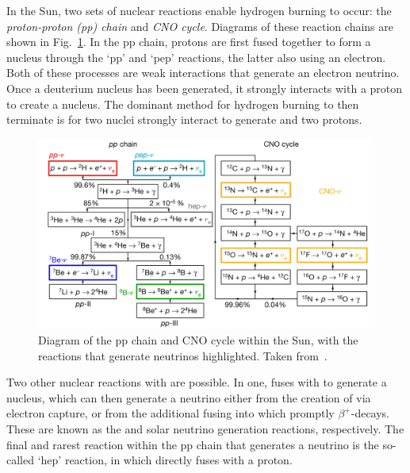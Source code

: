In the Sun, two sets of nuclear reactions enable hydrogen burning to occur: the \textit{proton-proton (pp) chain} and \textit{CNO cycle}. Diagrams of these reaction chains are shown in Fig.~\ref{fig:solar_nu_chains}. In the pp chain, protons are first fused together to form a  nucleus through the `pp' and `pep' reactions, the latter also using an electron. Both of these processes are weak interactions that generate an electron neutrino. Once a deuterium nucleus has been generated, it strongly interacts with a proton to create a  nucleus. The dominant method for hydrogen burning to then terminate is for two  nuclei strongly interact to generate  and two protons.

\begin{figure}
    \centering
    \includegraphics[width=\textwidth]{1_NeutrinoTheory/Figs/solar_nu_chains_diagram.png}
    \caption[Diagram of the pp chain and CNO cycle within the Sun]
    {Diagram of the pp chain and CNO cycle within the Sun, with the reactions that generate neutrinos highlighted. Taken from~\cite{agostiniComprehensiveMeasurementPpchain2018}.}
    \label{fig:solar_nu_chains}
\end{figure}

Two other nuclear reactions with  are possible. In one,  fuses with  to generate a  nucleus, which can then generate a neutrino either from the creation of  via electron capture, or from the additional fusing into \beight{} which promptly $\beta^{+}$-decays. These are known as the  and \beight{} solar neutrino generation reactions, respectively. The final and rarest reaction within the pp chain that generates a neutrino is the so-called `hep' reaction, in which  directly fuses with a proton.


